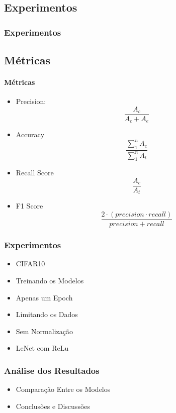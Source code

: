 \documentclass{beamer}
\begin{document}
\begin{frame}
\section{Experimentos} 
\frametitle{Experimentos}
\subsection{Métricas}
\framesubtitle{Métricas}
\begin{itemize}
\item Precision:
\begin{equation}
    \frac{A_c}{A_c + A_e}
\end{equation}
\item Accuracy
\begin{equation}
    \frac{\sum\limits_{1}^{n}A_c}{\sum\limits_{1}^{n}A_t}
\end{equation}
\item Recall Score
\begin{equation}
    \frac{A_c}{A_t}
\end{equation}
\item F1 Score
\begin{equation}
    \frac{2\cdot(precision\cdot recall)}{precision + recall}
\end{equation}
\end{itemize}
\end{frame}





\begin{frame}
\frametitle{Experimentos}
\begin{itemize}
    \item CIFAR10
    \item Treinando os Modelos
    \item Apenas um Epoch
    \item Limitando os Dados
    \item Sem Normalização
    \item LeNet com ReLu
\end{itemize}
\end{frame}















\begin{frame}
	\frametitle{Análise dos Resultados}
    \begin{itemize}
        \item{Comparação Entre os Modelos}
        \item Conclusões e Discussões
    \end{itemize}
 
\end{frame}
\end{document}
